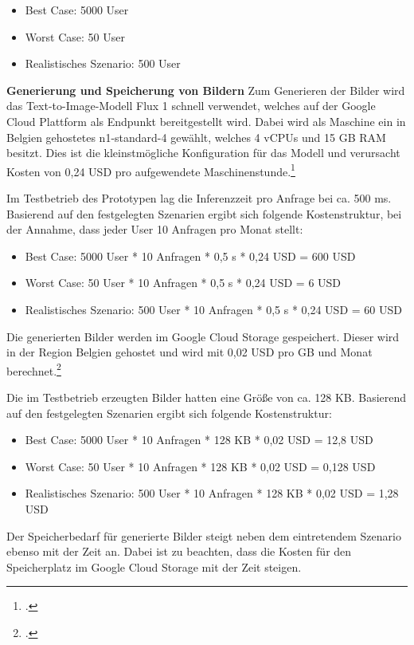 \begin{itemize}
    \item Best Case: 5000 User
    \item Worst Case: 50 User
    \item Realistisches Szenario: 500 User
\end{itemize}

\textbf{Generierung und Speicherung von Bildern}\newline
Zum Generieren der Bilder wird das Text-to-Image-Modell Flux 1 schnell verwendet, welches auf der Google Cloud Plattform als Endpunkt bereitgestellt wird.
Dabei wird als Maschine ein in Belgien gehostetes n1-standard-4 gewählt, welches 4 vCPUs und 15 GB RAM besitzt.
Dies ist die kleinstmögliche Konfiguration für das Modell und verursacht Kosten von 0,24 USD pro aufgewendete Maschinenstunde.\footcite{GoogleVertexAI2025}

Im Testbetrieb des Prototypen lag die Inferenzzeit pro Anfrage bei ca. 500 ms.
Basierend auf den festgelegten Szenarien ergibt sich folgende Kostenstruktur, bei der Annahme, dass jeder User 10 Anfragen pro Monat stellt:

\begin{itemize}
    \item Best Case: 5000 User * 10 Anfragen * 0,5 s * 0,24 USD = 600 USD
    \item Worst Case: 50 User * 10 Anfragen * 0,5 s * 0,24 USD = 6 USD
    \item Realistisches Szenario: 500 User * 10 Anfragen * 0,5 s * 0,24 USD = 60 USD
\end{itemize}

Die generierten Bilder werden im Google Cloud Storage gespeichert.
Dieser wird in der Region Belgien gehostet und wird mit 0,02 USD pro GB und Monat berechnet.\footcite{GoogleCloudStorage2025}

Die im Testbetrieb erzeugten Bilder hatten eine Größe von ca. 128 KB.
Basierend auf den festgelegten Szenarien ergibt sich folgende Kostenstruktur:
\begin{itemize}
    \item Best Case: 5000 User * 10 Anfragen * 128 KB * 0,02 USD = 12,8 USD
    \item Worst Case: 50 User * 10 Anfragen * 128 KB * 0,02 USD = 0,128 USD
    \item Realistisches Szenario: 500 User * 10 Anfragen * 128 KB * 0,02 USD = 1,28 USD
\end{itemize}

Der Speicherbedarf für generierte Bilder steigt neben dem eintretendem Szenario ebenso mit der Zeit an.
Dabei ist zu beachten, dass die Kosten für den Speicherplatz im Google Cloud Storage mit der Zeit steigen.

